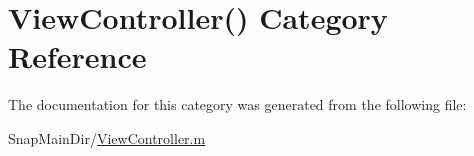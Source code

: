 \hypertarget{category_view_controller_07_08}{}\section{View\+Controller() Category Reference}
\label{category_view_controller_07_08}


The documentation for this category was generated from the following file\+:\begin{DoxyCompactItemize}
\item 
Snap\+Main\+Dir/\hyperlink{_view_controller_8m}{View\+Controller.\+m}\end{DoxyCompactItemize}
